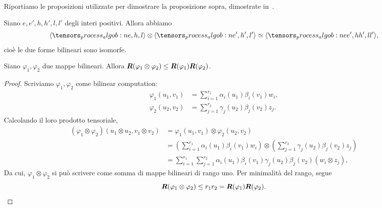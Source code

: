 Riportiamo le proposizioni utilizzate per dimostrare la proposizione sopra, dimostrate
in~\cite[Capitoli 14 e 15]{burgisser2013algebraic}.
\begin{proposition}
	\label{prop:bil_map_product}
	Siano $ e,e', h,h',l,l' $ degli interi positivi. Allora abbiamo
	\begin{equation*}
		\algob{e,h,l} \otimes \algob{e', h', l'}\simeq \algob{ee', hh', ll'},
	\end{equation*}
	cioè le due forme bilineari sono isomorfe.
\end{proposition}
\begin{proposition}
	\label{prop:rk_bil_map_product}
	Siano $ \varphi_1,\varphi_2 $ due mappe bilineari. Allora $ \bm{R}(\varphi_1 \otimes \varphi_{2}) \le
		\bm{R}(\varphi_1)\bm{R}(\varphi_2)$.
\end{proposition}
\begin{proof}
	Scriviamo $ \varphi_1,\varphi_2 $ come bilinear computation:
	\begin{equation*}
		\begin{aligned}
			\varphi_1(u_{1},v_1)   & = \sum_{i=1}^{r_1} \alpha_{i}(u_{1}) \beta_{i}(v_{1}) w_{i}, \\
			\varphi_2(u_{2},v_{2}) & = \sum_{j=1}^{r_2} \gamma_{j}(u_2) \beta_{j}(v_2) z_{j}.
		\end{aligned}
	\end{equation*}
	Calcolando il loro prodotto tensoriale,
	\begin{equation*}
		\begin{aligned}
			(\varphi_1 \otimes \varphi_2)(u_1 \otimes u_2, v_1 \otimes v_2) & = \varphi_1(u_1,v_1) \otimes
			\varphi_2(u_2, v_2)                                                                                                                                              \\
			                                                                & = \left(\sum_{i=1}^{r_1} \alpha_{i}(u_{1})
			\beta_{i}(v_{1}) w_{i}  \right) \otimes \left(  \sum_{j=1}^{r_2} \gamma_{j}(u_2)
			\beta_{j}(v_2) z_{j} \right)                                                                                                                                     \\
			                                                                & = \sum_{i=1}^{r_1}\sum_{j=1}^{r_2} \alpha_{i}(u_1)\beta_{i}(v_1)\gamma_{j}(u_2) \beta_{j}(v_2)
			(w_{i} \otimes z_{j}),
		\end{aligned}
	\end{equation*}
	Da cui, $ \varphi_1 \otimes \varphi_2 $ si può scrivere come somma di mappe bilineari di rango
	uno. Per minimalità del rango, segue
	\begin{equation*}
		\bm{R}(\varphi_1 \otimes \varphi_2) \le r_1r_2 = \bm{R}(\varphi_1)\bm{R}(\varphi_2).
	\end{equation*}
\end{proof}


